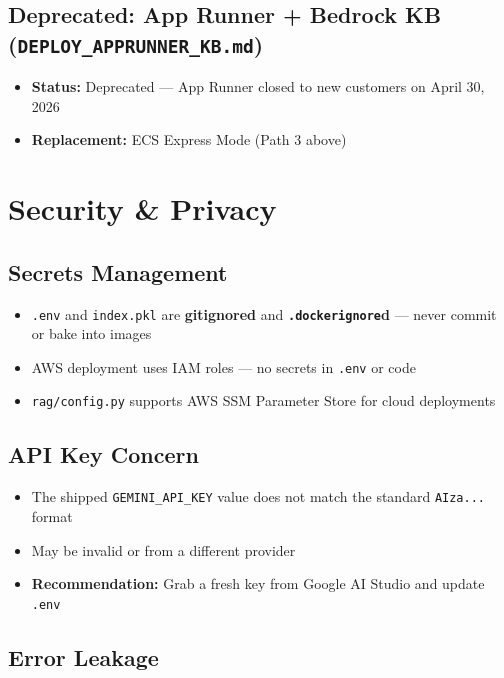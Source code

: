 \documentclass[11pt,a4paper]{paper}
\begin{document}
\subsection{Deprecated: App Runner + Bedrock KB (\texttt{DEPLOY\_APPRUNNER\_KB.md})}

\begin{itemize}
  \item \textbf{Status:} Deprecated — App Runner closed to new customers on April 30, 2026
  \item \textbf{Replacement:} ECS Express Mode (Path 3 above)
\end{itemize}

\section{Security \& Privacy}
\label{sec:security}

\subsection{Secrets Management}

\begin{itemize}
  \item \texttt{.env} and \texttt{index.pkl} are \textbf{gitignored} and \textbf{\texttt{.dockerignore}d} — never commit or bake into images
  \item AWS deployment uses IAM roles — no secrets in \texttt{.env} or code
  \item \texttt{rag/config.py} supports AWS SSM Parameter Store for cloud deployments
\end{itemize}

\subsection{API Key Concern}

\begin{itemize}
  \item The shipped \texttt{GEMINI\_API\_KEY} value does not match the standard \texttt{AIza...} format
  \item May be invalid or from a different provider
  \item \textbf{Recommendation:} Grab a fresh key from Google AI Studio and update \texttt{.env}
\end{itemize}

\subsection{Error Leakage}
\end{document}
